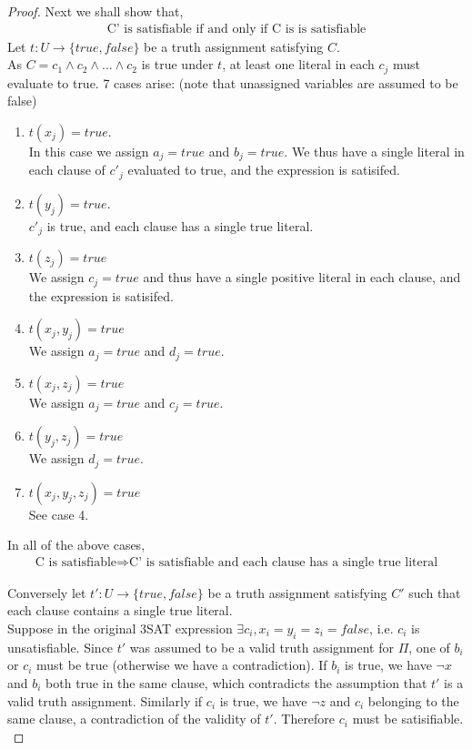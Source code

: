 \documentclass[12pt]{article}
\newenvironment{question}[2][Question]{\begin{trivlist}
\item[\hskip \labelsep {\bfseries #1}\hskip \labelsep {\bfseries #2.}]}{\end{trivlist}}
\begin{document}
\begin{question}{1}
\begin{proof}
    Next we shall show that,
    \begin{align*}
      \text{C' is satisfiable if and only if C is is satisfiable}
    \end{align*}
    Let $t:U \rightarrow \{true, false\}$ be a truth assignment satisfying $C$. \\
    As $C = c_{1} \land c_{2} \land ... \land c_{2}$ is true under $t$, at least
    one literal in each $c_{j}$ must evaluate to true.
    7 cases arise: (note that unassigned variables are assumed to be false)
    \begin{enumerate}
      \item $t(x_{j}) = true$.\\
        In this case we assign $a_{j} = true$ and $b_{j} = true$.
        We thus have a single literal in each clause of $c'_{j}$ evaluated to true, and
        the expression is satisifed.
      \item $t(y_{j}) = true$. \\
        $c'_{j}$ is true, and each clause has a single true literal.
      \item $t(z_{j}) = true$ \\
        We assign $c_{j} = true$ and thus have a single positive literal in each clause,
        and the expression is satisifed.
      \item $t(x_{j}, y_{j}) = true$ \\
        We assign $a_{j} = true$ and $d_{j} = true$.
      \item $t(x_{j}, z_{j}) = true$ \\
        We assign $a_{j} = true$ and $c_{j} = true$.
      \item $t(y_{j}, z_{j}) = true$ \\
        We assign $d_{j} = true$.
      \item $t(x_{j}, y_{j}, z_{j}) = true$ \\
        See case 4.
    \end{enumerate}
    In all of the above cases,
    \begin{align*}
      \text{C is satisfiable} \Rightarrow \text{C' is satisfiable and each clause has a single true literal}
    \end{align*}

    Conversely let $t':U \rightarrow \{true, false\}$ be a truth assignment satisfying
    $C'$ such that each clause contains a single true literal. \\

    Suppose in the original 3SAT expression $\exists c_{i}, x_{i} = y_{i} = z_{i} = false$, i.e.
    $c_{i}$ is unsatisfiable.  Since $t'$ was assumed to be a valid truth assignment
    for $\Pi$, one of $b_{i}$ or $c_{i}$ must be true (otherwise we have a contradiction).
    If $b_{i}$ is true, we have $\neg x$ and $b_{i}$ both true in the same clause, which
    contradicts the assumption that $t'$ is a valid truth assignment.  Similarly
    if $c_{i}$ is true, we have $\neg z$ and $c_{i}$ belonging to the same clause,
    a contradiction of the validity of $t'$.  Therefore $c_{i}$ must be satisifiable.\\


\end{proof}
\end{question}
\end{document}
